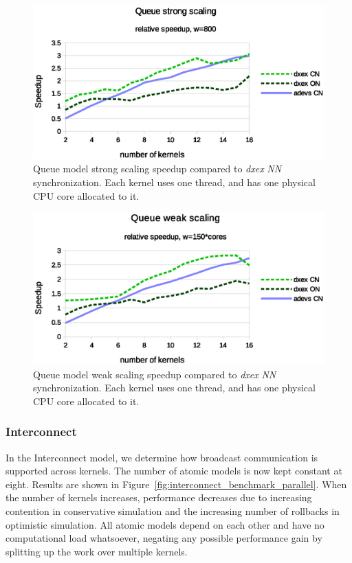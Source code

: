\begin{figure}
	\center
	\includegraphics[width=\columnwidth]{fig/queue_fixed_strong_speedup.eps}
	\caption{Queue model strong scaling speedup compared to \textit{dxex} \textit{NN} synchronization.
             Each kernel uses one thread, and has one physical CPU core allocated to it.}
	\label{fig:Queue_plot_strong}
\end{figure}

\begin{figure}
	\center
	\includegraphics[width=\columnwidth]{fig/queue_fixed_weak_speedup.eps}
	\caption{Queue model weak scaling speedup compared to \textit{dxex} \textit{NN} synchronization.
             Each kernel uses one thread, and has one physical CPU core allocated to it.}
	\label{fig:Queue_plot_weak}
\end{figure}
	
\subsubsection{Interconnect}
\label{subsec:parallelinterconnect}
In the Interconnect model, we determine how broadcast communication is supported across kernels.
The number of atomic models is now kept constant at eight.
Results are shown in Figure~\ref{fig:interconnect_benchmark_parallel}.
When the number of kernels increases, performance decreases due to increasing contention in conservative simulation and the increasing number of rollbacks in optimistic simulation.
All atomic models depend on each other and have no computational load whatsoever, negating any possible performance gain by splitting up the work over multiple kernels.

